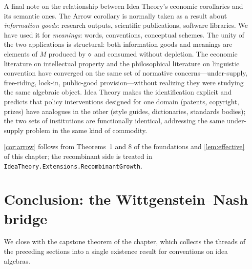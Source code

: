 A final note on the relationship between Idea Theory's economic
corollaries and its semantic ones. The Arrow corollary is normally
taken as a result about \emph{information goods}: research outputs,
scientific publications, software libraries. We have used it for
\emph{meanings}: words, conventions, conceptual schemes. The unity of
the two applications is structural: both information goods and
meanings are elements of $M$ produced by $\mathbin{\diamond}$ and consumed
without depletion. The economic literature on intellectual property
and the philosophical literature on linguistic convention have
converged on the same set of normative concerns---under-supply,
free-riding, lock-in, public-good provision---without realizing they
were studying the same algebraic object. Idea Theory makes the
identification explicit and predicts that policy interventions
designed for one domain (patents, copyright, prizes) have analogues
in the other (style guides, dictionaries, standards bodies); the two
sets of institutions are functionally identical, addressing the same
under-supply problem in the same kind of commodity.

\formalstatus \cref{cor:arrow} follows from Theorems~1 and 8 of the
foundations and \cref{lem:effective} of this chapter; the recombinant
side is treated in \texttt{IdeaTheory.Extensions.RecombinantGrowth}.

\section{Conclusion: the Wittgenstein--Nash bridge}\label{sec:conclusion}

We close with the capstone theorem of the chapter, which collects the
threads of the preceding sections into a single existence result for
conventions on idea algebras.

